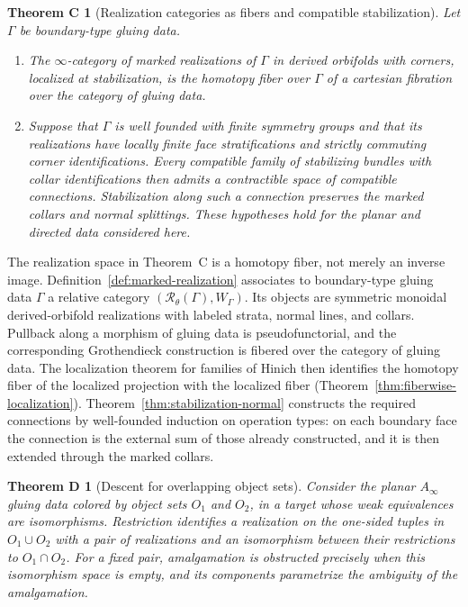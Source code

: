 \documentclass[11pt,letterpaper,twoside]{article}
\theoremstyle{plain}
\newtheorem*{theoremC}{Theorem C}
\newtheorem*{theoremD}{Theorem D}
\theoremstyle{definition}
\theoremstyle{remark}
\newcommand{\Ainf}{A_\infty}
\begin{document}
\begin{theoremC}[Realization categories as fibers and compatible stabilization]
Let \(\Gamma\) be boundary-type gluing data.
\begin{enumerate}
\item The \(\infty\)-category of marked realizations of \(\Gamma\) in derived orbifolds with corners, localized at stabilization, is the homotopy fiber over \(\Gamma\) of a cartesian fibration over the category of gluing data.
\item Suppose that \(\Gamma\) is well founded with finite symmetry groups and that its realizations have locally finite face stratifications and strictly commuting corner identifications.  Every compatible family of stabilizing bundles with collar identifications then admits a contractible space of compatible connections.  Stabilization along such a connection preserves the marked collars and normal splittings.  These hypotheses hold for the planar and directed data considered here.
\end{enumerate}
\end{theoremC}

The realization space in Theorem~C is a homotopy fiber, not merely an inverse image.  Definition~\ref{def:marked-realization} associates to boundary-type gluing data \(\Gamma\) a relative category \((\mathcal R_\theta(\Gamma),W_\Gamma)\).  Its objects are symmetric monoidal derived-orbifold realizations with labeled strata, normal lines, and collars.  Pullback along a morphism of gluing data is pseudofunctorial, and the corresponding Grothendieck construction is fibered over the category of gluing data.  The localization theorem for families of Hinich then identifies the homotopy fiber of the localized projection with the localized fiber (Theorem~\ref{thm:fiberwise-localization}).  Theorem~\ref{thm:stabilization-normal} constructs the required connections by well-founded induction on operation types: on each boundary face the connection is the external sum of those already constructed, and it is then extended through the marked collars.

\begin{theoremD}[Descent for overlapping object sets]
Consider the planar \(\Ainf\) gluing data colored by object sets \(O_1\) and \(O_2\), in a target whose weak equivalences are isomorphisms.  Restriction identifies a realization on the one-sided tuples in \(O_1\cup O_2\) with a pair of realizations and an isomorphism between their restrictions to \(O_1\cap O_2\).  For a fixed pair, amalgamation is obstructed precisely when this isomorphism space is empty, and its components parametrize the ambiguity of the amalgamation.
\end{theoremD}
\end{document}
